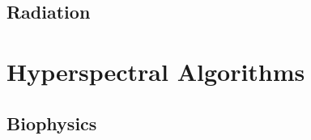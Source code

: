 \documentclass[a4paper,11pt]{report}
\begin{document}













\chapter{Radiation}















\part{Hyperspectral Algorithms}

\chapter{Biophysics}


















\end{document}

